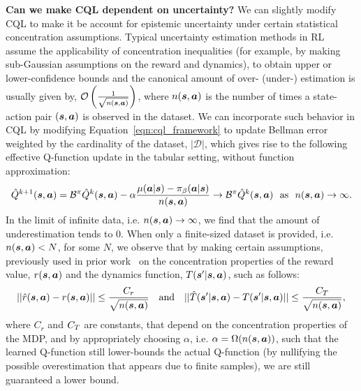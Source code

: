 \textbf{Can we make CQL dependent on uncertainty?} We can slightly modify CQL to make it be account for epistemic uncertainty under certain statistical concentration assumptions. Typical uncertainty estimation methods in RL~\citep{osband2016deep,jaksch2010near} assume the applicability of concentration inequalities (for example, by making sub-Gaussian assumptions on the reward and dynamics), to obtain upper or lower-confidence bounds and the canonical amount of over- (under-) estimation is usually given by,  $\mathcal{O}\left(\frac{1}{\sqrt{n(\boldsymbol{s}, \boldsymbol{a})}}\right)$, where $n(\boldsymbol{s}, \boldsymbol{a})$ is the number of times a state-action pair $(\boldsymbol{s}, \boldsymbol{a})$ is observed in the dataset. We can incorporate such behavior in CQL by modifying Equation~\ref{eqn:cql_framework} to update Bellman error weighted by the cardinality of the dataset, $|\mathcal{D}|$, which gives rise to the following effective Q-function update in the tabular setting, without function approximation:
\begin{equation*}
    \hat{Q}^{k+1}(\boldsymbol{s}, \boldsymbol{a}) = \mathcal{B}^\pi \hat{Q}^k(\boldsymbol{s}, \boldsymbol{a}) - \alpha \frac{\mu(\boldsymbol{a}|\boldsymbol{s}) - {\pi_\beta}(\boldsymbol{a}|\boldsymbol{s})}{n(\boldsymbol{s},\boldsymbol{a})} \rightarrow \mathcal{B}^\pi \hat{Q}^k(\boldsymbol{s}, \boldsymbol{a}) \text{~~as~~} n(\boldsymbol{s}, \boldsymbol{a}) \rightarrow \infty.
\end{equation*}
In the limit of infinite data, i.e. $n(\boldsymbol{s}, \boldsymbol{a}) \rightarrow \infty$, we find that the amount of underestimation tends to $0$. When only a finite-sized dataset is provided, i.e. $n(\boldsymbol{s}, \boldsymbol{a}) < N$, for some $N$, we observe that by making certain assumptions, previously used in prior work~\citep{jaksch2010near,osband2016deep} on the concentration properties of the reward value, $r(\boldsymbol{s}, \boldsymbol{a})$ and the dynamics function, $T(\boldsymbol{s}'|\boldsymbol{s}, \boldsymbol{a})$, such as follows:
\begin{equation*}
    ||\hat{r}(\boldsymbol{s}, \boldsymbol{a}) - r(\boldsymbol{s}, \boldsymbol{a})|| \leq \frac{C_r}{\sqrt{n(\boldsymbol{s}, \boldsymbol{a})}} ~~~ \text{and} ~~~ ||\hat{T}(\boldsymbol{s}'|\boldsymbol{s}, \boldsymbol{a}) - T(\boldsymbol{s}'|\boldsymbol{s}, \boldsymbol{a})|| \leq \frac{C_T}{\sqrt{n(\boldsymbol{s}, \boldsymbol{a})}}, 
\end{equation*}
where $C_r$ and $C_T$ are constants, that depend on the concentration properties of the MDP, and by appropriately choosing $\alpha$, i.e. $\alpha = \Omega (n(\boldsymbol{s}, \boldsymbol{a}))$, such that the learned Q-function still lower-bounds the actual Q-function (by nullifying the possible overestimation that appears due to finite samples), we are still guaranteed a lower bound. 


